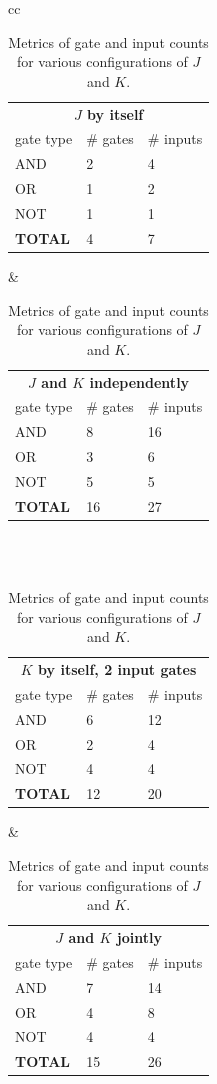 \documentclass[12pt]{article}
\begin{document}
\begin{table}[!htb]
\center
\begin{tabular}{cc}

\begin{tabular}{lll}
\multicolumn{3}{c}{\bf{$J$ by itself}} \\
gate type & \# gates & \# inputs\\
\hline
AND & 2 & 4\\
OR  & 1 & 2\\
NOT & 1 & 1 \\
\hline
\bf{TOTAL} & 4 & 7
\end{tabular}

&

\begin{tabular}{lll}
\multicolumn{3}{c}{\bf{$J$ and $K$ independently}} \\
gate type & \# gates & \# inputs\\
\hline
AND & 8 & 16 \\
OR  & 3 & 6  \\
NOT & 5 & 5  \\
\hline
\bf{TOTAL} & 16 & 27
\end{tabular}
\\
\\

\begin{tabular}{lll}
\multicolumn{3}{c}{\bf{$K$ by itself, 2 input gates}} \\
gate type & \# gates & \# inputs\\
\hline
AND & 6 & 12 \\
OR  & 2 & 4  \\
NOT & 4 & 4  \\
\hline
\bf{TOTAL} & 12 & 20
\end{tabular}

&

\begin{tabular}{lll}
\multicolumn{3}{c}{\bf{$J$ and $K$ jointly}} \\
gate type & \# gates & \# inputs\\
\hline
AND & 7 & 14 \\
OR  & 4 & 8  \\
NOT & 4 & 4  \\
\hline
\bf{TOTAL} & 15 & 26
\end{tabular}

\end{tabular} %

\caption{Metrics of gate and input counts for various configurations
of $J$ and $K$.}
\label{tbl:counts}
\end{table}
\end{document}
